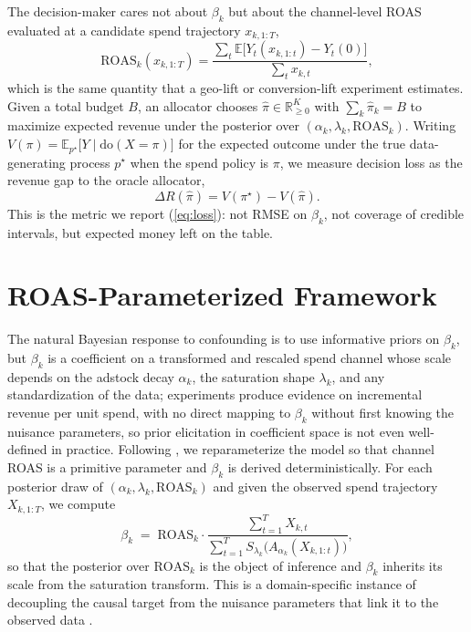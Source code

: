 \documentclass{uai2026} %
\newcommand{\ROAS}{\mathrm{ROAS}}
\newcommand{\bbE}{\mathbb{E}}
\newcommand{\dosym}{\mathrm{do}}
\begin{document}
The decision-maker cares not about $\beta_k$ but about the channel-level ROAS evaluated at a candidate spend trajectory $x_{k,1:T}$,
\begin{equation}\label{eq:roas}
    \ROAS_k(x_{k,1:T}) = \frac{\sum_t \bbE\!\bigl[Y_t(x_{k,1:t}) - Y_t(0)\bigr]}{\sum_t x_{k,t}},
\end{equation}
which is the same quantity that a geo-lift or conversion-lift experiment estimates.
Given a total budget $B$, an allocator chooses $\hat\pi \in \mathbb{R}_{\ge 0}^K$ with $\sum_k \hat\pi_k = B$ to maximize expected revenue under the posterior over $(\alpha_k, \lambda_k, \ROAS_k)$.
Writing $V(\pi) = \bbE_{p^\star}\!\bigl[Y \mid \dosym(X = \pi)\bigr]$ for the expected outcome under the true data-generating process $p^\star$ when the spend policy is $\pi$, we measure decision loss as the revenue gap to the oracle allocator,
\begin{equation}\label{eq:loss}
    \Delta R(\hat\pi) = V(\pi^\star) - V(\hat\pi).
\end{equation}
This is the metric we report (\ref{eq:loss}): not RMSE on $\beta_k$, not coverage of credible intervals, but expected money left on the table.

\section{ROAS-Parameterized Framework}\label{sec:method}

The natural Bayesian response to confounding is to use informative priors on $\beta_k$, but $\beta_k$ is a coefficient on a transformed and rescaled spend channel whose scale depends on the adstock decay $\alpha_k$, the saturation shape $\lambda_k$, and any standardization of the data; experiments produce evidence on incremental revenue per unit spend, with no direct mapping to $\beta_k$ without first knowing the nuisance parameters, so prior elicitation in coefficient space is not even well-defined in practice.
Following \citet{wurm2024mmmcalibration}, we reparameterize the model so that channel ROAS is a primitive parameter and $\beta_k$ is derived deterministically.
For each posterior draw of $(\alpha_k, \lambda_k, \ROAS_k)$ and given the observed spend trajectory $X_{k,1:T}$, we compute
\begin{equation}\label{eq:roas-beta}
    \beta_k \;=\; \ROAS_k \cdot \frac{\sum_{t=1}^T X_{k,t}}{\sum_{t=1}^T S_{\lambda_k}\!\bigl(A_{\alpha_k}(X_{k,1:t})\bigr)},
\end{equation}
so that the posterior over $\ROAS_k$ is the object of inference and $\beta_k$ inherits its scale from the saturation transform.
This is a domain-specific instance of decoupling the causal target from the nuisance parameters that link it to the observed data \citep{evans2024frugal,orduz2024frugal}.
\end{document}
